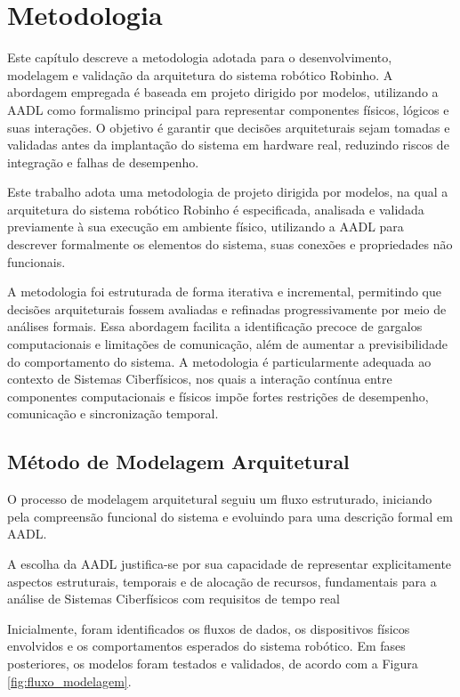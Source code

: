 \chapter{Metodologia}

Este capítulo descreve a metodologia adotada para o desenvolvimento, modelagem e validação da arquitetura do sistema robótico Robinho. A abordagem empregada é baseada em projeto dirigido por modelos, utilizando a AADL como formalismo principal para representar componentes físicos, lógicos e suas interações. O objetivo é garantir que decisões arquiteturais sejam tomadas e validadas antes da implantação do sistema em hardware real, reduzindo riscos de integração e falhas de desempenho.

Este trabalho adota uma metodologia de projeto dirigida por modelos, na qual a arquitetura do sistema robótico Robinho é especificada, analisada e validada previamente à sua execução em ambiente físico, utilizando a AADL para descrever formalmente os elementos do sistema, suas conexões e propriedades não funcionais.

A metodologia foi estruturada de forma iterativa e incremental, permitindo que decisões arquiteturais fossem avaliadas e refinadas progressivamente por meio de análises formais. Essa abordagem facilita a identificação precoce de gargalos computacionais e limitações de comunicação, além de aumentar a previsibilidade do comportamento do sistema. 
A metodologia é particularmente adequada ao contexto de Sistemas Ciberfísicos, nos quais a interação contínua entre componentes computacionais e físicos impõe fortes restrições de desempenho, comunicação e sincronização temporal.


\section{Método de Modelagem Arquitetural}

O processo de modelagem arquitetural seguiu um fluxo estruturado, iniciando pela compreensão funcional do sistema e evoluindo para uma descrição formal em AADL. 

A escolha da AADL justifica-se por sua capacidade de representar explicitamente aspectos estruturais, temporais e de alocação de recursos, fundamentais para a análise de Sistemas Ciberfísicos com requisitos de tempo real

Inicialmente, foram identificados os fluxos de dados, os dispositivos físicos envolvidos e os comportamentos esperados do sistema robótico. Em fases posteriores, os modelos foram testados e validados, de acordo com a Figura \ref{fig:fluxo_modelagem}.

